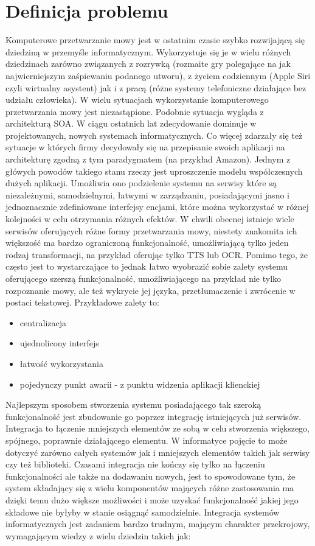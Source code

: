 \section{Definicja problemu} %
Komputerowe przetwarzanie mowy jest w ostatnim czasie szybko rozwijającą się dziedziną w przemyśle informatycznym. Wykorzystuje się je w wielu różnych dziedzinach zarówno związanych z rozrywką (rozmaite gry polegające na jak najwierniejszym zaśpiewaniu podanego utworu), z życiem codziennym (Apple Siri czyli wirtualny asystent) jak i z pracą (różne systemy telefoniczne działające bez udziału człowieka). W wielu sytuacjach wykorzystanie komputerowego przetwarzania mowy jest niezastąpione.
Podobnie sytuacja wygląda z architekturą SOA. W ciągu ostatnich lat zdecydowanie dominuje w projektowanych, nowych systemach informatycznych. Co więcej zdarzały się też sytuacje w których firmy decydowały się na przepisanie swoich aplikacji na architekturę zgodną z tym paradygmatem (na przykład Amazon). Jednym z główych powodów takiego stanu rzeczy jest uproszczenie modelu współczesnych dużych aplikacji. Umożliwia ono podzielenie systemu na serwisy które są niezależnymi, samodzielnymi, łatwymi w zarządzaniu, posiadającymi jasno i jednoznacznie zdefiniowane interfejsy encjami, które można wykorzystać w różnej kolejności w celu otrzymania różnych efektów. W chwili obecnej istnieje wiele serwisów oferujących różne formy przetwarzania mowy, niestety znakomita ich większość ma bardzo ograniczoną funkcjonalność, umożliwiającą tylko jeden rodzaj transformacji, na przykład oferując tylko TTS lub OCR. Pomimo tego, że często jest to wystarczające to jednak łatwo wyobrazić sobie zalety systemu oferującego szerszą funkcjonalność, umożliwiającego na przykład nie tylko rozpoznanie mowy, ale też wykrycie jej języka, przetłumaczenie i zwrócenie w postaci tekstowej. Przykładowe zalety to:
 \begin{itemize}
	\item centralizacja
	\item ujednolicony interfejs
	\item łatwość wykorzystania
	\item pojedynczy punkt awarii - z punktu widzenia aplikacji klienckiej
\end{itemize} 
Najlepszym sposobem stworzenia systemu posiadającego tak szeroką funkcjonalność jest zbudowanie go poprzez integrację istniejących już serwisów. Integracja to łączenie mniejszych elementów ze sobą w celu stworzenia większego, spójnego, poprawnie działającego elementu. W informatyce pojęcie to może dotyczyć zarówno całych systemów jak i mniejszych elementów takich jak serwisy czy też biblioteki. Czasami integracja nie kończy się tylko na łączeniu funkcjonalności ale także na dodawaniu nowych, jest to spowodowane tym, że system składający się z wielu komponentów mających różne zastosowania ma dzięki temu dużo większe możliwości i może uzyskać funkcjonalność jakiej jego składowe nie byłyby w stanie osiągnąć samodzielnie. Integracja systemów informatycznych jest zadaniem bardzo trudnym, mającym charakter przekrojowy, wymagającym wiedzy z wielu dziedzin takich jak:
